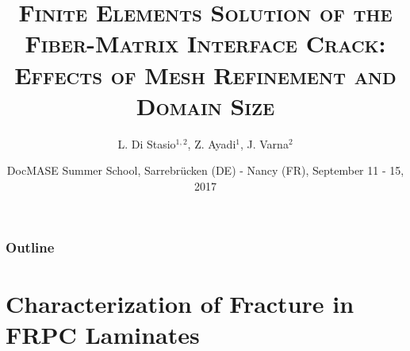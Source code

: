 \documentclass[first,firstsupp,lastsupp,last,hyperref,table]{ETHclass}
\makeatletter
\newenvironment{withoutheadline}{
         \setbeamertemplate{headline}{%
\vspace{35pt}
}
    }{}
\makeatother
\begin{document}

\title[\textsc{FEM \& the Fiber-Matrix Interface Crack}]{\textsc{Finite Elements Solution of the Fiber-Matrix Interface Crack: Effects of Mesh Refinement and Domain Size}}
\author{ L. Di Stasio$^{1,2}$, Z. Ayadi$^{1}$, J. Varna$^{2}$}
\date{DocMASE Summer School, Sarrebr\"ucken (DE) - Nancy (FR), September 11 - 15, 2017}

\begin{frame}[plain]
    \titlepage

\end{frame}

\begin{withoutheadline}
\begin{frame}
\frametitle{Outline}
\justifying
\vspace*{-0.5cm}
\tableofcontents[hidesubsections]
\end{frame}
\end{withoutheadline}



\section[Characterization of Fracture in FRPC]{Characterization of Fracture in FRPC Laminates}
\end{document}
